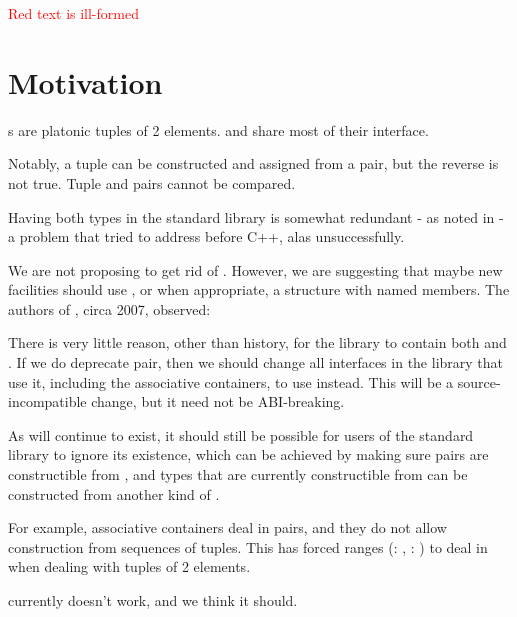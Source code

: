 \documentclass{wg21}
\begin{document}
\textcolor{red}{Red text is ill-formed}

\section{Motivation}

s are platonic tuples of 2 elements.  and  share
most of their interface.

Notably, a tuple can be constructed and assigned from a pair, but the reverse is not true.
Tuple and pairs cannot be compared.

Having both types in the standard library is somewhat redundant - as noted in  - a problem that 
tried to address before C++, alas unsuccessfully.

We are not proposing to get rid of .
However, we are suggesting that maybe new facilities should use , or when appropriate, a structure with named members.
The authors of , circa 2007, observed:

\begin{quoteblock}
There is very little reason, other than history, for the library to contain both  and . If we do deprecate pair, then we should change all interfaces in the library that use it, including the associative containers, to use  instead. This will be a source-incompatible change, but it need not be ABI-breaking.
\end{quoteblock}

As  will continue to exist, it should still be possible for users of the standard library to ignore its existence, which can be achieved by making sure pairs are constructible from , and types that are currently constructible from  can be constructed from another kind of .

For example, associative containers deal in pairs, and they do not allow construction from sequences of tuples. This has forced ranges (: , : ) to deal in  when dealing with tuples of 2 elements.

 currently doesn't work, and we think it should.

\end{document}
